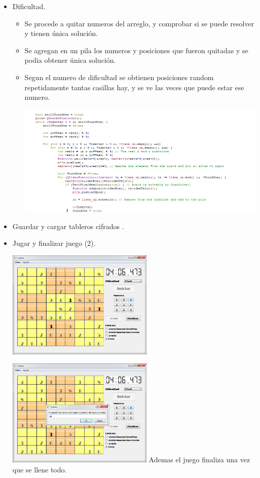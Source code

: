 \documentclass[12pt,oneside]{book}
\begin{document}
\begin{itemize}
\begin{itemize}
\end {itemize}

\item  Dificultad.
\begin {itemize}
	\item Se procede a quitar numeros del arreglo, y comprobar si se puede resolver y tienen única solución.
	\item Se agregan en un pila los numeros y posiciones que fueron quitadas y se podia obtener única solución.
	\item Segun el numero de dificultad se obtienen posiciones random repetidamente tantas casillas hay, y se ve las veces 
	que puede estar ese numero.


	\includegraphics[width=1.2\textwidth]{./imagenes/Codigo_dificultad.png}
\end {itemize}
\item  Guardar y cargar tableros cifrados .

	
\item   Jugar y finalizar juego (2).

 	\includegraphics[width=0.55\textwidth]{./imagenes/PantallaJugando.png}

	\includegraphics[width=0.55\textwidth]{./imagenes/Codigo_finalizar.png}
	Ademas el juego finaliza una vez que se llene todo. 


\end{itemize}
\end{document}
